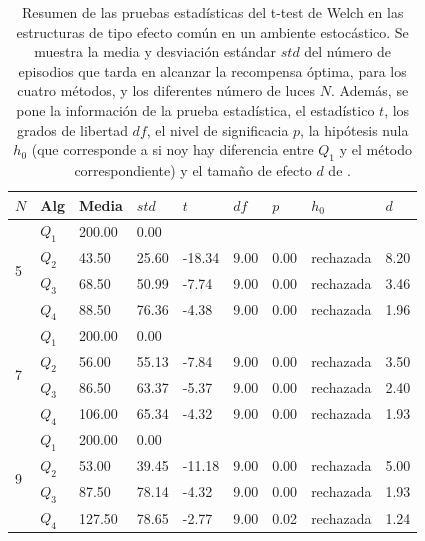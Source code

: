 \begin{table}[]
\centering
\caption{\footnotesize{Resumen de las pruebas estadísticas del t-test de Welch en las
estructuras de tipo efecto común en un ambiente estocástico. Se muestra la media y desviación estándar $std$ del número 
de episodios que tarda en alcanzar la recompensa óptima, para los cuatro métodos, y los diferentes número de luces $N$. Además, se pone la información
de la prueba estadística, el estadístico $t$, los grados de libertad $df$, el nivel
de significacia $p$, la hipótesis nula $h_0$ (que corresponde a si noy hay diferencia entre $Q_1$ y el método correspondiente) y el tamaño de efecto $d$ de \citet{cohen2013statistical}.}}
\label{tab:dqn-common-effect-sto}
\begin{tabular}{|l|l|l|l|l|l|l|l|l|}
\hline
$N$ & Alg & Media & $std$ & $t$ & $df$ & $p$ & $h_0$ & $d$ \\ \hline
\multirow{4}{*}{5} & $Q_1$ & 200.00 & 0.00 & \multicolumn{5}{l|}{} \\ \cline{2-9} 
 & $Q_2$ & 43.50 & 25.60 & -18.34 & 9.00 & 0.00 & rechazada & 8.20 \\ \cline{2-9} 
 & $Q_3$ & 68.50 & 50.99 & -7.74 & 9.00 & 0.00 & rechazada & 3.46 \\ \cline{2-9} 
 & $Q_4$ & 88.50 & 76.36 & -4.38 & 9.00 & 0.00 & rechazada & 1.96 \\ \hline
\multirow{4}{*}{7} & $Q_1$ & 200.00 & 0.00 & \multicolumn{5}{l|}{} \\ \cline{2-9} 
 & $Q_2$ & 56.00 & 55.13 & -7.84 & 9.00 & 0.00 & rechazada & 3.50 \\ \cline{2-9} 
 & $Q_3$ & 86.50 & 63.37 & -5.37 & 9.00 & 0.00 & rechazada & 2.40 \\ \cline{2-9} 
 & $Q_4$ & 106.00 & 65.34 & -4.32 & 9.00 & 0.00 & rechazada & 1.93 \\ \hline
\multirow{4}{*}{9} & $Q_1$ & 200.00 & 0.00 & \multicolumn{5}{l|}{} \\ \cline{2-9} 
 & $Q_2$ & 53.00 & 39.45 & -11.18 & 9.00 & 0.00 & rechazada & 5.00 \\ \cline{2-9} 
 & $Q_3$ & 87.50 & 78.14 & -4.32 & 9.00 & 0.00 & rechazada & 1.93 \\ \cline{2-9} 
 & $Q_4$ & 127.50 & 78.65 & -2.77 & 9.00 & 0.02 & rechazada & 1.24 \\ \hline
\end{tabular}
\end{table}


